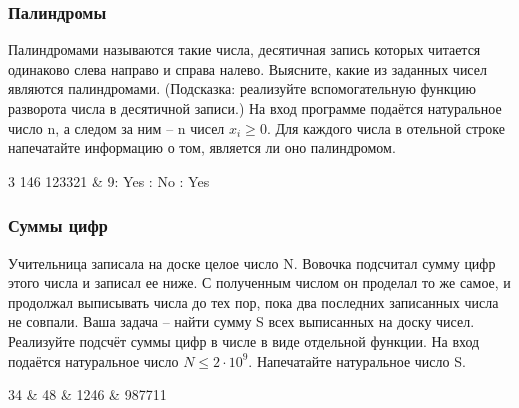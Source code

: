 \begin{frame}
	\frametitle{Палиндромы}
Палиндромами называются такие числа, десятичная запись которых читается
	одинаково слева направо и справа налево. Выясните, какие из заданных чисел
	являются палиндромами. (Подсказка: реализуйте вспомогательную функцию
	разворота числа в десятичной записи.)
	\inp
	На вход программе подаётся натуральное число n, а следом за ним -- n чисел
	$x_i \geq 0$. 
	\out
	Для каждого числа в отельной строке напечатайте информацию о том, является ли
	оно палиндромом.
	\begin{ex}
		3  146 123321 & 9: Yes : No : Yes \tb
	\end{ex}
\end{frame}

\begin{frame}
	\frametitle{Суммы цифр}
	Учительница записала на доске целое число N. Вовочка подсчитал сумму цифр этого
	числа и записал ее ниже. С полученным числом он проделал то же самое, и
	продолжал выписывать числа до тех пор, пока два последних записанных числа не
	совпали. Ваша задача -- найти сумму S всех выписанных на доску чисел. Реализуйте
	подсчёт суммы цифр в числе в виде отдельной функции.
	\inp
	На вход подаётся натуральное число $N \leq 2\cdot 10^9$.
	\out
	Напечатайте натуральное число S.
	\begin{ex}
		34 & 48  & 1246  & 987711 \tb
	\end{ex}
\end{frame}


